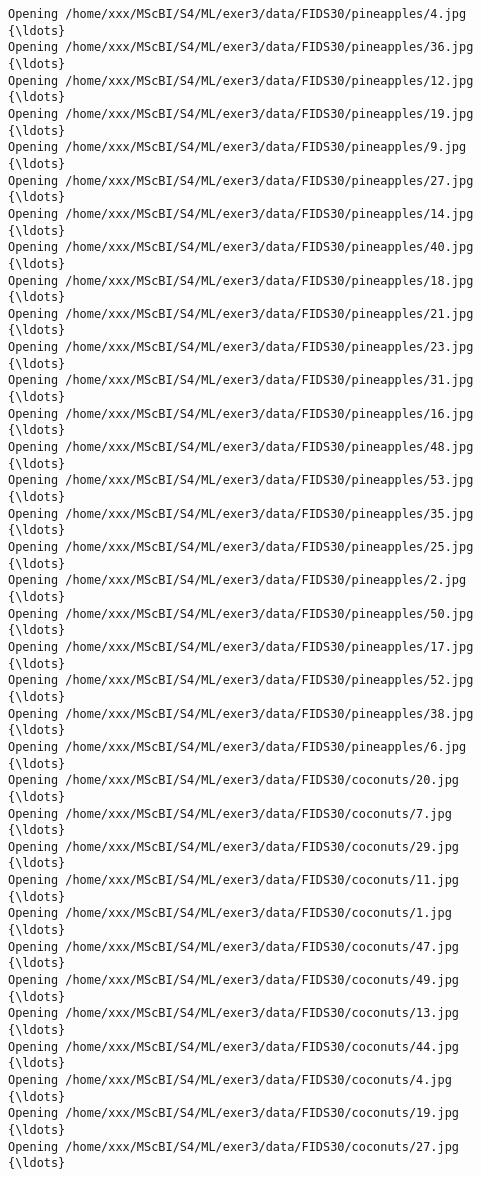 \documentclass[11pt]{article}
\begin{document}
\begin{Verbatim}[commandchars=\\\{\}]
Opening /home/xxx/MScBI/S4/ML/exer3/data/FIDS30/pineapples/4.jpg  {\ldots}
Opening /home/xxx/MScBI/S4/ML/exer3/data/FIDS30/pineapples/36.jpg  {\ldots}
Opening /home/xxx/MScBI/S4/ML/exer3/data/FIDS30/pineapples/12.jpg  {\ldots}
Opening /home/xxx/MScBI/S4/ML/exer3/data/FIDS30/pineapples/19.jpg  {\ldots}
Opening /home/xxx/MScBI/S4/ML/exer3/data/FIDS30/pineapples/9.jpg  {\ldots}
Opening /home/xxx/MScBI/S4/ML/exer3/data/FIDS30/pineapples/27.jpg  {\ldots}
Opening /home/xxx/MScBI/S4/ML/exer3/data/FIDS30/pineapples/14.jpg  {\ldots}
Opening /home/xxx/MScBI/S4/ML/exer3/data/FIDS30/pineapples/40.jpg  {\ldots}
Opening /home/xxx/MScBI/S4/ML/exer3/data/FIDS30/pineapples/18.jpg  {\ldots}
Opening /home/xxx/MScBI/S4/ML/exer3/data/FIDS30/pineapples/21.jpg  {\ldots}
Opening /home/xxx/MScBI/S4/ML/exer3/data/FIDS30/pineapples/23.jpg  {\ldots}
Opening /home/xxx/MScBI/S4/ML/exer3/data/FIDS30/pineapples/31.jpg  {\ldots}
Opening /home/xxx/MScBI/S4/ML/exer3/data/FIDS30/pineapples/16.jpg  {\ldots}
Opening /home/xxx/MScBI/S4/ML/exer3/data/FIDS30/pineapples/48.jpg  {\ldots}
Opening /home/xxx/MScBI/S4/ML/exer3/data/FIDS30/pineapples/53.jpg  {\ldots}
Opening /home/xxx/MScBI/S4/ML/exer3/data/FIDS30/pineapples/35.jpg  {\ldots}
Opening /home/xxx/MScBI/S4/ML/exer3/data/FIDS30/pineapples/25.jpg  {\ldots}
Opening /home/xxx/MScBI/S4/ML/exer3/data/FIDS30/pineapples/2.jpg  {\ldots}
Opening /home/xxx/MScBI/S4/ML/exer3/data/FIDS30/pineapples/50.jpg  {\ldots}
Opening /home/xxx/MScBI/S4/ML/exer3/data/FIDS30/pineapples/17.jpg  {\ldots}
Opening /home/xxx/MScBI/S4/ML/exer3/data/FIDS30/pineapples/52.jpg  {\ldots}
Opening /home/xxx/MScBI/S4/ML/exer3/data/FIDS30/pineapples/38.jpg  {\ldots}
Opening /home/xxx/MScBI/S4/ML/exer3/data/FIDS30/pineapples/6.jpg  {\ldots}
Opening /home/xxx/MScBI/S4/ML/exer3/data/FIDS30/coconuts/20.jpg  {\ldots}
Opening /home/xxx/MScBI/S4/ML/exer3/data/FIDS30/coconuts/7.jpg  {\ldots}
Opening /home/xxx/MScBI/S4/ML/exer3/data/FIDS30/coconuts/29.jpg  {\ldots}
Opening /home/xxx/MScBI/S4/ML/exer3/data/FIDS30/coconuts/11.jpg  {\ldots}
Opening /home/xxx/MScBI/S4/ML/exer3/data/FIDS30/coconuts/1.jpg  {\ldots}
Opening /home/xxx/MScBI/S4/ML/exer3/data/FIDS30/coconuts/47.jpg  {\ldots}
Opening /home/xxx/MScBI/S4/ML/exer3/data/FIDS30/coconuts/49.jpg  {\ldots}
Opening /home/xxx/MScBI/S4/ML/exer3/data/FIDS30/coconuts/13.jpg  {\ldots}
Opening /home/xxx/MScBI/S4/ML/exer3/data/FIDS30/coconuts/44.jpg  {\ldots}
Opening /home/xxx/MScBI/S4/ML/exer3/data/FIDS30/coconuts/4.jpg  {\ldots}
Opening /home/xxx/MScBI/S4/ML/exer3/data/FIDS30/coconuts/19.jpg  {\ldots}
Opening /home/xxx/MScBI/S4/ML/exer3/data/FIDS30/coconuts/27.jpg  {\ldots}

\end{Verbatim}
\end{document}
